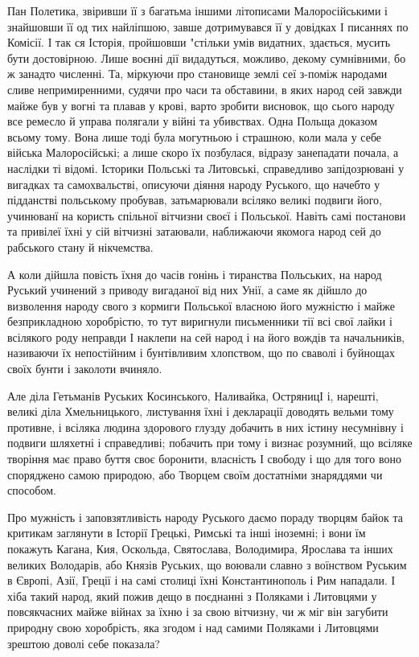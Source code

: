Пан Полетика, звіривши її з багатьма іншими літописами Малоросійськими і
знайшовши її од тих найліпшою, завше дотримувався її у довідках І писаннях по
Комісії. І так ся Історія, пройшовши "стільки умів видатних, здається, мусить
бути достовірною. Лише воєнні дії видадуться, можливо, декому сумнівними, бо ж
занадто численні. Та, міркуючи про становище землі сеї з-поміж народами сливе
непримиренними, судячи про часи та обставини, в яких народ сей завжди майже був
у вогні та плавав у крові, варто зробити висновок, що сього народу все ремесло
й управа полягали у війні та убивствах. Одна Польща доказом всьому тому. Вона
лише тоді була могутньою і страшною, коли мала у себе війська Малоросійські; а
лише скоро їх позбулася, відразу занепадати почала, а наслідки ті відомі.
Історики Польські та Литовські, справедливо запідозрювані у вигадках та
самохвальстві, описуючи діяння народу Руського, що начебто у підданстві
польському пробував, затьмарювали всіляко великі подвиги його, учинюванї на
користь спільної вітчизни своєї і Польської. Навіть самі постанови та привілеї
їхні у сій вітчизні затаювали, наближаючи якомога народ сей до рабського стану
й нікчемства. 

А коли дійшла повість їхня до часів гонінь і тиранства Польських,
на народ Руський учинений з приводу вигаданої від них Унії, а саме як дійшло до
визволення народу свого з кормиги Польської власною його мужністю і майже
безприкладною хоробрістю, то тут виригнули письменники тії всі свої лайки і
всілякого роду неправди І наклепи на сей народ і на його вождів та начальників,
називаючи їх непостійним і бунтівливим хлопством, що по сваволі і буйнощах
своїх бунти і заколоти вчиняло. 

Але діла Гетьманів Руських Косинського, Наливайка, ОстряницІ і, нарешті, великі
діла Хмельницького, листування їхні і декларації доводять вельми тому противне,
і всіляка людина здорового глузду добачить в них істину несумнівну і подвиги
шляхетні і справедливі; побачить при тому і визнає розумний, що всіляке
творіння має право буття своє боронити, власність І свободу і що для того воно
споряджено самою природою, або Творцем своїм достатніми знаряддями чи способом.

Про мужність і заповзятливість народу Руського даємо пораду творцям байок та
критикам заглянути в Історії Грецькі, Римські та інші іноземні; і вони їм
покажуть Кагана, Кия, Оскольда, Святослава, Володимира, Ярослава та інших
великих Володарів, або Князів Руських, що воювали славно з воїнством Руським в
Європі, Азії, Греції і на самі столиці їхні Константинополь і Рим нападали. І
хіба такий народ, який пожив дещо в поєднанні з Поляками і Литовцями у
повсякчасних майже війнах за їхню і за свою вітчизну, чи ж міг він загубити
природну свою хоробрість, яка згодом і над самими Поляками і Литовцями зрештою
доволі себе показала?

